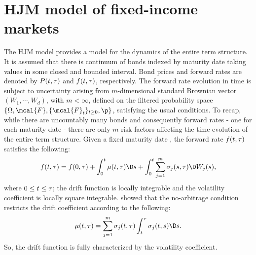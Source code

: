 \section{HJM model of fixed-income markets}
The HJM model provides a model for the dynamics of the entire term structure. It is assumed that there is  continuum of bonds indexed by maturity date \T taking values in some closed and bounded interval. Bond prices and forward rates are denoted by $P(t, \tau)$ and $f(t, \tau)$, respectively. The forward rate evolution in time is subject to uncertainty arising from $m$-dimensional  standard Brownian vector $(W_1, \cdots, W_d)$, with $m < \infty$, defined on the filtered probability space $\{\Omega, \mcal{F}, \{\mcal{F}_t\}_{t\ge 0}, \p\}$, satisfying the usual conditions. To recap, while there are uncountably many bonds and consequently forward rates - one for each maturity date - there are only $m$ risk factors affecting the time evolution of the entire term structure. Given a fixed maturity date \T, the forward rate $f(t, \tau)$ satisfies the following:
\begin{align}
  f(t,\T) = f(0, \T) + \int^t_0 \mu(t,\T) \D s + \int^t_0 \sum_{j = 1}^m \sigma_j(s,\T) \D W_j (s),
  \label{eq:fd}
\end{align}
where $0 \le t \le \tau$; the drift function is locally  integrable and the volatility coefficient is locally square integrable. \cite{Heath1992} showed that the no-arbitrage condition restricts the drift coefficient according to the following:
\begin{align}
  \mu(t, \T) = \sum_{j = 1}^m \sigma_j(t,\T) \int_t^\T \sigma_j(t, s) \D s.\notag
  \label{}
\end{align}
So, the drift function is fully characterized by the volatility coefficient.
